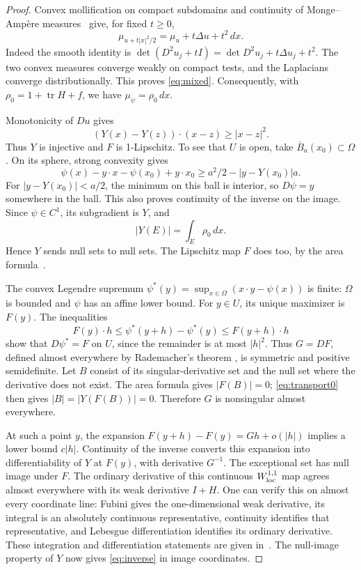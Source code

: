 \documentclass[11pt]{article}
\theoremstyle{remark}
\numberwithin{equation}{section}
\newcommand{\tr}{\operatorname{tr}}
\begin{document}
\begin{proof}
Convex mollification on compact subdomains and continuity of
Monge--Amp\`ere measures~\cite[Proposition~2.4]{DPF} give, for fixed \(t\ge0\),
\begin{equation}\label{eq:mixed}
\mu_{u+t|x|^2/2}=\mu_u+t\Delta u+t^2\,dx.
\end{equation}
Indeed the smooth identity is
\(\det(D^2u_j+tI)=\det D^2u_j+t\Delta u_j+t^2\).
The two convex measures converge weakly on compact tests, and the
Laplacians converge distributionally. This proves \eqref{eq:mixed}.
Consequently, with
\(\rho_0=1+\tr H+f\), we have \(\mu_\psi=\rho_0\,dx\).

Monotonicity of \(Du\) gives
\[
(Y(x)-Y(z))\cdot(x-z)\ge |x-z|^2.
\]
Thus \(Y\) is injective and \(F\) is 1-Lipschitz. To see that \(U\) is open,
take \(\overline B_a(x_0)\subset\Omega\).
On its sphere, strong convexity gives
\[
\psi(x)-y\cdot x-\psi(x_0)+y\cdot x_0
\ge a^2/2-|y-Y(x_0)|a.
\]
For \(|y-Y(x_0)|<a/2\), the minimum on this ball is interior,
so \(D\psi=y\) somewhere in the ball. This also proves continuity of the
inverse on the image. Since \(\psi\in C^1\), its subgradient is \(Y\), and
\begin{equation}\label{eq:transport0}
|Y(E)|=\int_E\rho_0\,dx.
\end{equation}
Hence \(Y\) sends null sets to null sets. The Lipschitz map \(F\) does too,
by the area formula~\cite[\S2, Theorem~1]{Jerrard}.

The convex Legendre supremum
\(\psi^*(y)=\sup_{x\in\Omega}(x\cdot y-\psi(x))\) is finite:
\(\Omega\) is bounded and \(\psi\) has an affine lower bound.
For \(y\in U\), its unique maximizer is \(F(y)\). The inequalities
\[
F(y)\cdot h\le \psi^*(y+h)-\psi^*(y)\le F(y+h)\cdot h
\]
show that \(D\psi^*=F\) on \(U\), since the remainder is at most \(|h|^2\).
Thus \(G=DF\), defined almost everywhere by Rademacher's theorem
\cite[Theorem~2.2.4]{Tao}, is symmetric and positive semidefinite.
Let \(B\) consist of its singular-derivative set and the null set where
the derivative does not exist. The area formula gives \(|F(B)|=0\);
\eqref{eq:transport0} then gives \(|B|=|Y(F(B))|=0\).
Therefore \(G\) is nonsingular almost everywhere.

At such a point \(y\), the expansion
\(F(y+h)-F(y)=Gh+o(|h|)\) implies a lower bound \(c|h|\).
Continuity of the inverse converts this expansion into differentiability
of \(Y\) at \(F(y)\), with derivative \(G^{-1}\).
The exceptional set has null image under \(F\). The ordinary derivative
of this continuous \(W^{1,1}_{\rm loc}\) map agrees almost everywhere
with its weak derivative \(I+H\).
One can verify this on almost every coordinate line: Fubini gives the
one-dimensional weak derivative, its integral is an absolutely continuous
representative, continuity identifies that representative, and Lebesgue
differentiation identifies its ordinary derivative. These integration
and differentiation statements are given in~\cite[Theorems~1.6.11--12
and~1.7.21]{Tao}. The null-image property of \(Y\) now gives
\eqref{eq:inverse} in image coordinates.


\end{proof}
\end{document}
